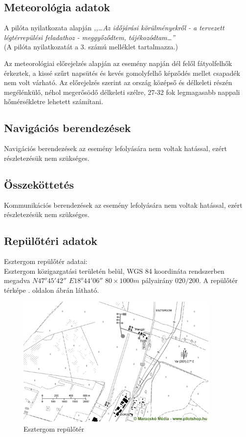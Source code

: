 \documentclass[a4paper,10pt]{article}
\begin{document}
\subsection{Meteorológia adatok}
A pilóta nyilatkozata alapján \textit{,,\dots Az időjárási körülményekről - a 
tervezett légtérrepülési feladathoz - meggyőződtem, tájékozódtam\dots ''}\\
(A pilóta nyilatkozatát a 3. számú melléklet tartalmazza.)

Az meteorológiai előrejelzés alapján az esemény napján dél felől
fátyolfelhők érkeztek, a kissé szűrt napsütés és kevés gomolyfelhő képződés 
mellet csapadék nem volt várható. Az előrejelzés szerint az ország középső
és délkeleti részén megélénkülő, néhol megerősödő délkeleti szélre, 27-32 
fok legmagasabb nappali hőmérsékletre lehetett számítani.

\subsection{Navigációs berendezések}
Navigációs berendezések az esemény lefolyására nem voltak hatással, ezért 
részletezésük nem szükséges.

\subsection{Összeköttetés}
Kommunikációs berendezések az esemény lefolyására nem voltak hatással, 
ezért részletezésük nem szükséges.

\subsection{Repülőtéri adatok}
Esztergom repülőtér adatai:\\
Esztergom közigazgatási területén belül, WGS 84 koordináta rendszerben megadva 
$N47^o 45' 42''$ $E18^o 44' 06''$ $80\times1000m$ pályairány $020/200$.
A repülőtér térképe . oldalon  ábrán látható.
\begin{figure}[ht!]
\centering
 \includegraphics[width=10cm]{kepek/LHEM}
 \caption{Esztergom repülőtér}\label{LHEM}
 
\end{figure}
\end{document}
